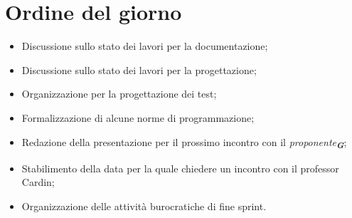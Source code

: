 

\section{Ordine del giorno}

\begin{itemize}
    \item Discussione sullo stato dei lavori per la documentazione;
    \item Discussione sullo stato dei lavori per la progettazione;
    \item Organizzazione per la progettazione dei test;
    \item Formalizzazione di alcune norme di programmazione;
    \item Redazione della presentazione per il prossimo incontro con il \emph{proponente}\textsubscript{\textit{\textbf{G}}};
    \item Stabilimento della data per la quale chiedere un incontro con il professor Cardin;
    \item Organizzazione delle attività burocratiche di fine sprint.
\end{itemize}